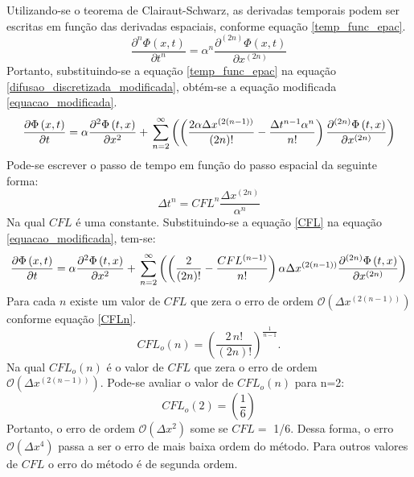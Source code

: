 \documentclass[10pt,twoside,a4paper]{article}
\begin{document}
Utilizando-se o teorema de Clairaut-Schwarz, as derivadas temporais podem ser escritas em função das derivadas espaciais, conforme equação \ref{temp_func_epac}.
\begin{equation} \label{temp_func_epac}
\frac{\partial^{n} \Phi \left( x,t \right)}{\partial t^{n}} =  \alpha^{n} \frac{\partial^{\left(2n\right)} \Phi \left( x,t \right)}{\partial x^{\left(2n\right)}}
\end{equation}
Portanto, substituindo-se a equação \ref{temp_func_epac} na equação \ref{difusao_discretizada_modificada}, obtém-se a equação modificada \ref{equacao_modificada}.
\begin{equation} \label{equacao_modificada}
\frac{\partial \Phi \left( x,t \right)}{\partial t} = \alpha \frac{\partial^{2} \Phi \left(t, x\right)}{\partial x^{2}}+ \\
 \sum\limits_{n=2}^{\infty}\left( \left(\frac{ 2 \alpha \Delta x^{\left(2\left(n-1\right)\right)}}{\left(2n\right)!} -\frac{\Delta t^{n-1} \alpha^{n}}{n!}\right) \frac{\partial^{\left(2n\right)} \Phi \left(t, x\right)}{\partial x^{\left(2n\right)}}\right)
\end{equation}
Pode-se escrever o passo de tempo em função do passo espacial da seguinte forma:
\begin{equation} \label{CFL}
\Delta t^n= CFL^n \frac{\Delta x^{\left(2n\right)}}{\alpha^{n}}
\end{equation}
Na qual $CFL$ é uma constante. Substituindo-se a equação \ref{CFL} na equação \ref{equacao_modificada}, tem-se:
\begin{equation} \label{equacao_modificadaCFL}
\frac{\partial \Phi \left( x,t \right)}{\partial t} = \alpha \frac{\partial^{2} \Phi \left(t, x\right)}{\partial x^{2}}+ \\
\sum\limits_{n=2}^{\infty}\left( \left(\frac{ 2  }{\left(2n\right)!} -\frac{CFL^{\left(n-1\right)}  }{n!}\right) \alpha \Delta x^{\left(2\left(n-1\right)\right)} \frac{\partial^{\left(2n\right)} \Phi \left(t, x\right)}{\partial x^{\left(2n\right)}}\right)
\end{equation}
Para cada $n$ existe um valor de $CFL$ que zera o erro de ordem  $\mathcal{O}\left(\Delta x^{\left(2\left(n-1\right)\right)}\right)$ conforme equação \ref{CFLn}.
\begin{equation} \label{CFLn}
CFL_o\left(n\right)=\left(\frac{2 \, n!}{(2n)!}\right)^\frac{1}{n-1}.
\end{equation}
Na qual $CFL_o\left(n\right)$ é o valor de $CFL$ que zera o erro de ordem  $\mathcal{O}\left(\Delta x^{\left(2\left(n-1\right)\right)}\right)$. Pode-se avaliar o valor de $CFL_o\left(n\right)$ para n=2:
\begin{equation} \label{CFL_otimo}
CFL_o\left(2\right)=\left(\frac{1}{6}\right)
\end{equation}
Portanto, o erro de ordem $\mathcal{O}(\Delta x^2)$ some se $CFL=$ 1/6. Dessa forma, o erro $\mathcal{O}(\Delta x^4)$ passa a ser o erro de mais baixa ordem do método. Para outros valores de $CFL$ o erro do método é de segunda ordem.
\end{document}
